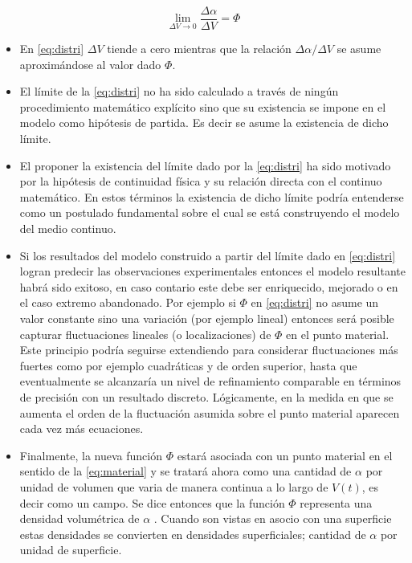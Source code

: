 \documentclass[../notas medios.tex]{subfiles}
\begin{document}
\begin{equation}
\lim_{\Delta V \to 0} \frac{\Delta \alpha}{\Delta V} = \Phi
\label{eq:distri}
\end{equation}

\begin{itemize}
\item En \cref{eq:distri} $\Delta V$ tiende a cero mientras que la relación 
$\Delta \alpha /\Delta V$ se asume aproximándose al valor dado $\Phi$.

\item El límite de la \cref{eq:distri} no ha sido calculado a través de ningún
procedimiento matemático explícito sino que su existencia se impone en el modelo como hipótesis de partida.  Es decir se asume la existencia de dicho límite.

\item El proponer la existencia del límite dado por la \cref{eq:distri} ha sido
motivado por la hipótesis de continuidad física y su relación directa con el continuo matemático. En estos términos la existencia de dicho límite podría entenderse como un postulado fundamental sobre el cual se está construyendo el modelo del medio continuo. 

\item Si los resultados del modelo construido a partir del límite dado en
\cref{eq:distri} logran predecir las observaciones experimentales entonces el 
modelo resultante habrá sido exitoso, en caso contario este debe ser 
enriquecido, mejorado o en el caso extremo abandonado.  Por ejemplo si $\Phi$ 
en \cref{eq:distri} no asume un valor constante sino una variación (por ejemplo 
lineal) entonces será posible capturar fluctuaciones lineales (o 
localizaciones) de $\Phi$ en el punto material.  Este principio podría seguirse 
extendiendo para considerar fluctuaciones más fuertes como por ejemplo 
cuadráticas y de orden superior, hasta que eventualmente se alcanzaría un nivel 
de refinamiento comparable en términos de precisión con un resultado discreto.  
Lógicamente, en la medida en que se aumenta el orden de la fluctuación asumida 
sobre el punto material aparecen cada vez más ecuaciones.

\item Finalmente, la nueva función $\Phi$ estará asociada con un punto material 
en el sentido de la \cref{eq:material} y se tratará ahora como una cantidad de 
$\alpha$ por unidad de volumen que varia de manera continua a lo largo de 
$V(t)$, es decir como un campo.  Se dice entonces que la función $\Phi$ 
representa una densidad volumétrica de $\alpha$ .  Cuando son vistas en asocio 
con una superficie estas densidades se convierten en densidades superficiales; 
cantidad de $\alpha$ por unidad de superficie.

\end{itemize}
\end{document}
